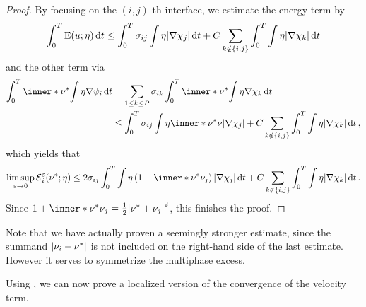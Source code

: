 \begin{proof}
	By focusing on the $ ( i, j )$-th interface, we estimate the energy term by
	\begin{equation*}
		\int_{ 0 }^{ T }
		\operatorname{E} ( u ; \eta )
		\dd{ t }
		\leq
		\int_{ 0 }^{ T }
		\sigma_{ i j }
		\int
		\eta
		\abs{ \nabla \chi_{ j } }
		\dd{ t }
		+
		C \sum_{ k \notin \{ i , j \} }
		\int_{ 0 }^{ T }
		\int
		\eta
		\abs{ \nabla \chi_{ k } }
		\dd{ t }
	\end{equation*}
	and the other term via
	\begin{align*}
		\int_{ 0 }^{ T }
		\inner*{ \nu^{ \ast } }
		{
			\int
			\eta
			\nabla \psi_{ i }
		}
		\dd{ t }
		& =
		\sum_{ 1 \leq k \leq P }
		\sigma_{ i k }
		\int_{ 0 }^{ T }
		\inner*{ \nu^{ \ast } }
		{
			\int
			\eta 
			\nabla \chi_{ k }
		}
		\dd{ t }
		\\
		& \leq
		\int_{ 0 }^{ T }
		\sigma_{ i j }
		\int
		\eta
		\inner*{ \nu^{ \ast } }{ \nu }
		\abs{ \nabla \chi_{ j } }
		+
		C \sum_{ k \notin \{ i , j \} }
		\int_{ 0 }^{ T }
		\int
		\eta
		\abs{ \nabla \chi_{ k } }
		\dd{ t },
	\end{align*}
	which yields that
	\begin{equation*}
		\limsup_{ \varepsilon \to 0 }
		\tilt_excess_{ i }^{ \varepsilon } ( \nu^{ \ast } ; \eta )
		\leq
		2 \sigma_{ i j } \int_{ 0 }^{ T }
		\int
		\eta
		\left( 1 + \inner*{ \nu^{ \ast } }{ \nu_{ j } } \right)
		\abs{ \nabla \chi_{ j } }
		\dd{ t }
		+
		C \sum_{ k \notin \{ i , j \} }
		\int_{ 0 }^{ T }
		\int
		\eta 
		\abs{ \nabla \chi_{ k } }
		\dd{ t }.
	\end{equation*}
	Since $ 1 + \inner*{ \nu^{ \ast } }{ \nu_{ j } } = \frac{ 1 }{ 2 } \abs{ 
		\nu^{ \ast } + \nu_{ j } }^{ 2 } $, this finishes the proof.
\end{proof}

Note that we have actually proven a seemingly stronger estimate, since the 
summand $ \abs{ \nu_{ i } - \nu^{ \ast } } $ is not included on the right-hand 
side of the last estimate. However it serves to symmetrize the multiphase 
excess.

Using , we can 
now prove a localized version of the convergence of the velocity term.


